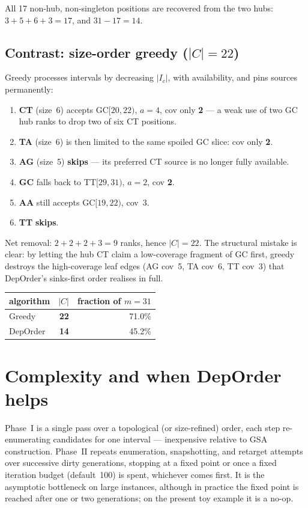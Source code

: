 \documentclass[11pt,a4paper]{article}
\begin{document}
All 17 non-hub, non-singleton positions are recovered from the two
hubs: \(3+5+6+3=17\), and \(31-17=14\).

\subsection{Contrast: size-order greedy (\(|C|=22\))}

Greedy processes intervals by decreasing \(|I_c|\), with availability,
and pins sources permanently:
\begin{enumerate}
\item \textbf{CT} (size~6) accepts GC\([20,22)\), \(a=4\), cov only
  \textbf{2} --- a weak use of two GC hub ranks to drop two of six CT
  positions.
\item \textbf{TA} (size~6) is then limited to the same spoiled GC
  slice: cov only \textbf{2}.
\item \textbf{AG} (size~5) \textbf{skips} --- its preferred CT source
  is no longer fully available.
\item \textbf{GC} falls back to TT\([29,31)\), \(a=2\), cov
  \textbf{2}.
\item \textbf{AA} still accepts GC\([19,22)\), cov~3.
\item \textbf{TT} \textbf{skips}.
\end{enumerate}
Net removal: \(2+2+2+3=9\) ranks, hence \(|C|=22\). The structural
mistake is clear: by letting the hub CT claim a low-coverage fragment
of GC first, greedy destroys the high-coverage leaf edges (AG cov~5,
TA cov~6, TT cov~3) that DepOrder's sinks-first order realises in
full.

\begin{center}
\begin{tabular}{@{}lrr@{}}
\toprule
algorithm & \(|C|\) & fraction of \(m=31\) \\
\midrule
Greedy   & \textbf{22} & 71.0\% \\
DepOrder & \textbf{14} & 45.2\% \\
\bottomrule
\end{tabular}
\end{center}

\section{Complexity and when DepOrder helps}

Phase~I is a single pass over a topological (or size-refined) order,
each step re-enumerating candidates for one interval --- inexpensive
relative to GSA construction. Phase~II repeats enumeration,
snapshotting, and retarget attempts over successive dirty generations,
stopping at a fixed point or once a fixed iteration budget
(default~100) is spent, whichever comes first. It is the asymptotic
bottleneck on large instances, although in practice the fixed point is
reached after one or two generations; on the present toy example it is
a no-op.
\end{document}
